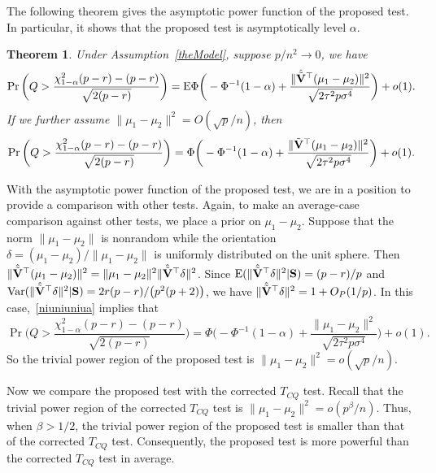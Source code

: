 \documentclass[times,sort&compress,3p]{elsarticle}
\newcommand{\myE}{ {\rm E} }
\newcommand{\myVar}{ {\rm Var} }
\theoremstyle{plain}
\newtheorem{theorem}{\quad\quad Theorem}
\theoremstyle{definition}
\theoremstyle{remark}
\begin{document}
The following theorem gives the asymptotic power function of the proposed test.
 In particular, it shows that the proposed test is asymptotically level $\alpha$.
\begin{theorem}\label{testPowerh}
    Under Assumption~\ref{theModel},
suppose $p/n^2\to 0$, we have
        \begin{equation}\label{niuniuniua}
        \Pr\bigg(Q>\frac{\chi^2_{1-\alpha}(p-r)-(p-r)}{\sqrt{2(p-r)}}\bigg)=
            \myE\Phi\bigg(-\Phi^{-1}(1-\alpha)+\frac{\|\hat{\tilde{\BV}}^\top (\mu_1-\mu_2)\|^2}{\sqrt{2\tau^2 p\sigma^4}}\bigg)+o(1).
        \end{equation}
     If we further assume $\|\mu_1-\mu_2\|^2=O({\sqrt{p}}/{n})$, then
    \begin{equation}\label{niuniuniub}
        \Pr\bigg(Q>\frac{\chi^2_{1-\alpha}(p-r)-(p-r)}{\sqrt{2(p-r)}}\bigg)=\Phi\bigg(-\Phi^{-1}(1-\alpha)+\frac{\|\tilde{\mathbf{V}}^\top (\mu_1-\mu_2)\|^2}{\sqrt{2\tau^2 p\sigma^4}}\bigg)+o(1).
    \end{equation}
\end{theorem}

With the asymptotic power function of the proposed test, we are in a position to provide a comparison with other tests.
Again, to make an average-case comparison against other tests, we place a prior on $\mu_1-\mu_2$.
Suppose that the norm $\|\mu_1-\mu_2\|$ is nonrandom while the orientation $\delta=(\mu_1-\mu_2)/\|\mu_1-\mu_2\|$ is uniformly distributed on the unit sphere.
Then $\|\hat{\tilde{\mathbf{V}}}^\top (\mu_1-\mu_2)\|^2=\|\mu_1-\mu_2\|^2 \|\hat{\tilde{\mathbf{V}}}^\top \delta\|^2$.
Since $\myE (\|\hat{\tilde{\BV}}^\top \delta\|^2|\BS)=(p-r)/p$ and $\myVar (\|\hat{\tilde{\BV}}^\top \delta\|^2|\BS) = 2r(p-r)/\big(p^2(p+2)\big)$, we have $\|\hat{\tilde{\mathbf{V}}}^\top \delta\|^2=1+O_P(1/p)$.
In this case,~\eqref{niuniuniua} implies that
    \begin{equation*}
        \Pr\bigg(Q>\frac{\chi^2_{1-\alpha}(p-r)-(p-r)}{\sqrt{2(p-r)}}\bigg)=
        \Phi\bigg(-\Phi^{-1}(1-\alpha)+\frac{\|\mu_1-\mu_2\|^2}{\sqrt{2\tau^2 p\sigma^4}}\bigg)+o(1).
    \end{equation*}
So the trivial power region of the proposed test is $\|\mu_1-\mu_2\|^2= o(\sqrt{p}/n)$.

Now we compare the proposed test with the corrected $T_{CQ}$ test.
Recall that the trivial power region of the corrected $T_{CQ}$ test is $\|\mu_1-\mu_2\|^2=o( p^{\beta}/n)$.
 Thus, when $\beta>1/2$, the trivial power region of the proposed test is smaller than that of the corrected $T_{CQ}$ test.
Consequently, the proposed test is more powerful than the corrected $T_{CQ}$ test in average.
\end{document}
